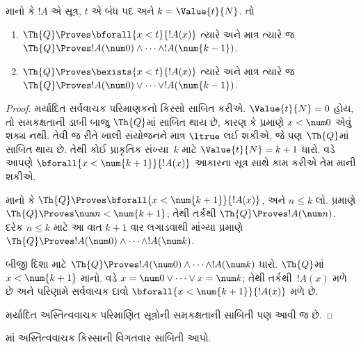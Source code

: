 \begin{lem}
માનો કે $!A$ એ સૂત્ર,
$t$ એ બંધ પદ અને
$k=\Value{t}{N}$. તો
\begin{enumerate}
\item $\Th{Q} \Proves \bforall{x<t}{!A(x)}$
ત્યારે અને માત્ર ત્યારે જ
$\Th{Q} \Proves
    !A(\num 0) \land \dots \land !A(\num{k-1})$.
\item $\Th{Q} \Proves \bexists{x<t}{!A(x)}$
ત્યારે અને માત્ર ત્યારે જ
$\Th{Q} \Proves
    !A(\num 0) \lor \dots \lor !A(\num{k-1})$.
\end{enumerate}
\end{lem}

\begin{proof}
    મર્યાદિત સર્વવાચક પરિમાણકનો
    કિસ્સો સાબિત કરીએ.
    $\Value{t}{N} = 0$ હોય,
    તો સમકક્ષતાની ડાબી બાજુ
    $\Th{Q}$માં સાબિત થાય છે,
    કારણ કે 
    પ્રમાણે $x<\num 0$
    એવું શક્ય નથી.
    તેવી જ રીતે ખાલી સંયોજનને
    માત્ર $\ltrue$ લઈ શકીએ,
    જે પણ $\Th{Q}$માં
    સાબિત થાય છે.
    તેથી કોઈ પ્રાકૃતિક સંખ્યા~$k$
    માટે $\Value{t}{N} = k+1$
    ધારો. 
    વડે આપણે
    $\bforall{x<\num{k+1}}{!A(x)}$
    આકારના સૂત્ર સાથે
    કામ કરીએ તેમ માની શકીએ.
    
    માનો કે $\Th{Q} \Proves
    \bforall{x<\num{k+1}}{!A(x)}$,
    અને $n \leq k$ લો.
    પ્રમાણે $\Th{Q} \Proves
    \num n < \num{k+1}$;
    તેથી તર્કથી $\Th{Q} \Proves
    !A(\num n)$. દરેક
    $n \leq k$ માટે આ વાત
    $k+1$ વાર લગાડવાથી
    માંગ્યા પ્રમાણે
    $\Th{Q} \Proves !A(\num 0)
    \land \dots \land !A(\num k)$.
    
    બીજી દિશા માટે
    $\Th{Q} \Proves
    !A(\num 0) \land \dots \land !A(\num k)$
    ધારો. $\Th{Q}$માં
    $x < \num{k+1}$ માનો.
    વડે
    $x = \num 0 \lor \dots \lor x = \num k$;
    તેથી તર્કથી~$!A(x)$
    મળે છે અને પરિણામે
    સર્વવાચક દાવો
    $\bforall{x<\num{k+1}}{!A(x)}$
    મળે છે.
    
    મર્યાદિત અસ્તિત્વવાચક
    પરિમાણિત સૂત્રોની
    સમકક્ષતાની સાબિતી પણ આવી જ છે.
\end{proof}

\begin{prob}
માં
અસ્તિત્વવાચક કિસ્સાની વિગતવાર
સાબિતી આપો.
\end{prob}

